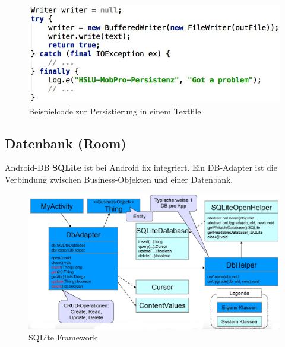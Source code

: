 \documentclass[a4paper]{article}
\begin{document}
	\begin{figure}[htb!]
		\centering
		\includegraphics[width=.7\textwidth]{img/persist_text.jpg}
		\caption{Beispielcode zur Persistierung in einem Textfile}
	\end{figure}

\newpage	
	
\subsection{Datenbank (Room)}

Android-DB \textbf{SQLite} ist bei Android fix integriert. Ein DB-Adapter ist die Verbindung zwischen Business-Objekten und einer Datenbank.

\begin{figure}[htb!]
	\centering
	\includegraphics[width=.85\textwidth]{img/sqlite_framework.png}
	\caption{SQLite Framework}
\end{figure}
\end{document}
